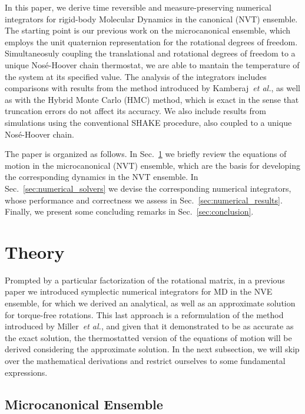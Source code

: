 \documentclass[aip,jcp,reprint,amsmath,amssymb]{revtex4-1}
\begin{document}
In this paper, we derive time reversible and measure-preserving numerical integrators for rigid-body Molecular Dynamics in the canonical (NVT) ensemble. The starting point is our previous work on the microcanonical ensemble,\citep{Abreu_2017} which employs the unit quaternion representation for the rotational degrees of freedom. Simultaneosuly coupling the translational and rotational degrees of freedom to a unique Nos\'{e}-Hoover chain thermostat, we are able to mantain the temperature of the system at its specified value. The analysis of the integrators includes comparisons with results from the method introduced by Kamberaj~\textit{et al.},\cite{Kamberaj2005} as well as with the Hybrid Monte Carlo (HMC) method,\cite{Duane1987} which is exact in the sense that truncation errors do not affect its accuracy. We also include results from simulations using the conventional SHAKE\cite{Ryckaert1977} procedure, also coupled to a unique Nos\'{e}-Hoover chain.

The paper is organized as follows. In Sec.~\ref{sec:theory} we briefly review the equations of motion in the microcanonical (NVT) ensemble, which are the basis for developing the corresponding dynamics in the NVT ensemble. In Sec.~\ref{sec:numerical_solvers} we devise the corresponding numerical integrators, whose performance and correctness we assess in Sec.~\ref{sec:numerical_results}. Finally, we present some concluding remarks in Sec.~\ref{sec:conclusion}.

\section{Theory}
\label{sec:theory}

Prompted by a particular factorization of the rotational matrix, in a previous paper\cite{Abreu_2017} we introduced symplectic numerical integrators for MD in the NVE ensemble, for which we derived an analytical, as well as an approximate solution for torque-free rotations. This last approach is a reformulation of the method introduced by Miller~\textit{et al.},\cite{Miller2002} and given that it demonstrated to be as accurate as the exact solution, the thermostatted version of the equations of motion will be derived considering the approximate solution. In the next subsection, we will skip over the mathematical derivations and restrict ourselves to some fundamental expressions.

\subsection{Microcanonical Ensemble}
\end{document}
